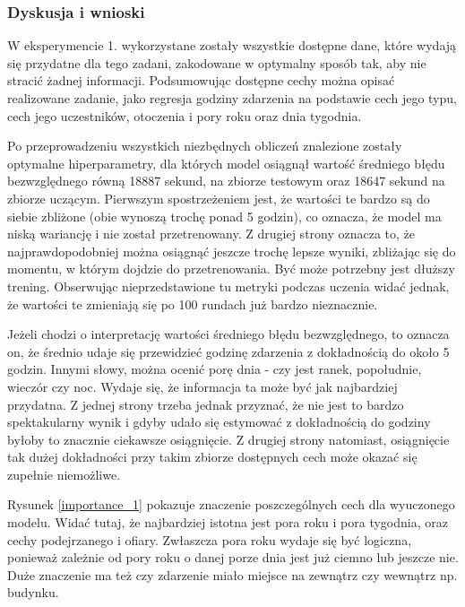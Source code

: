 \documentclass{classrep}
\begin{document}
{{            \subsubsection{Dyskusja i wnioski} {
                W eksperymencie 1. wykorzystane zostały wszystkie dostępne dane, które wydają się przydatne dla tego zadani, zakodowane w optymalny sposób tak, aby nie stracić żadnej informacji. Podsumowując dostępne cechy można opisać realizowane zadanie, jako regresja godziny zdarzenia na podstawie cech jego typu, cech jego uczestników, otoczenia i pory roku oraz dnia tygodnia.
                
                Po przeprowadzeniu wszystkich niezbędnych obliczeń znalezione zostały optymalne hiperparametry, dla których model osiągnął wartość średniego błędu bezwzględnego równą 18887 sekund, na zbiorze testowym oraz 18647 sekund na zbiorze uczącym. Pierwszym spostrzeżeniem jest, że wartości te bardzo są do siebie zbliżone (obie wynoszą trochę ponad 5 godzin), co oznacza, że model ma niską wariancję i nie został przetrenowany. Z drugiej strony oznacza to, że najprawdopodobniej można osiągnąć jeszcze trochę lepsze wyniki, zbliżając się do momentu, w którym dojdzie do przetrenowania. Być może potrzebny jest dłuższy trening. Obserwując nieprzedstawione tu metryki podczas uczenia widać jednak, że wartości te zmieniają się po 100 rundach już bardzo nieznacznie.
                
                Jeżeli chodzi o interpretację wartości średniego błędu bezwzględnego, to oznacza on, że średnio udaje się przewidzieć godzinę zdarzenia z dokładnością do około 5 godzin. Innymi słowy, można ocenić porę dnia - czy jest ranek, popołudnie, wieczór czy noc. Wydaje się, że informacja ta może być jak najbardziej przydatna. Z jednej strony trzeba jednak przyznać, że nie jest to bardzo spektakularny wynik i gdyby udało się estymować z dokładnością do godziny byłoby to znacznie ciekawsze osiągnięcie. Z drugiej strony natomiast, osiągnięcie tak dużej dokładności przy takim zbiorze dostępnych cech może okazać się zupełnie niemożliwe.
                
                Rysunek \ref{importance_1} pokazuje znaczenie poszczególnych cech dla wyuczonego modelu. Widać tutaj, że najbardziej istotna jest pora roku i pora tygodnia, oraz cechy podejrzanego i ofiary. Zwłaszcza pora roku wydaje się być logiczna, ponieważ zależnie od pory roku o danej porze dnia jest już ciemno lub jeszcze nie. Duże znaczenie ma też czy zdarzenie miało miejsce na zewnątrz czy wewnątrz np. budynku.
                
}}}
\end{document}
